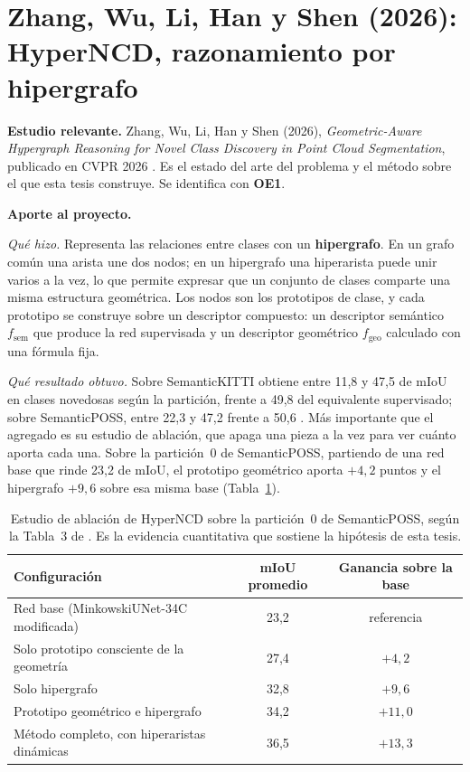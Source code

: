 \section[HyperNCD]{Zhang, Wu, Li, Han y Shen (2026): HyperNCD, razonamiento por
hipergrafo}
\label{sec:hyperncd}

\textbf{Estudio relevante.} Zhang, Wu, Li, Han y Shen (2026),
\emph{Geometric-Aware Hypergraph Reasoning for Novel Class Discovery in Point
Cloud Segmentation}, publicado en CVPR 2026 \cite{zhang2026hyperncd}. Es el
estado del arte del problema y el método sobre el que esta tesis construye. Se
identifica con \textbf{OE1}.

\textbf{Aporte al proyecto.}

\emph{Qué hizo.} Representa las relaciones entre clases con un
\textbf{hipergrafo}. En un grafo común una arista une dos nodos; en un hipergrafo
una hiperarista puede unir varios a la vez, lo que permite expresar que un
conjunto de clases comparte una misma estructura geométrica. Los nodos son los
prototipos de clase, y cada prototipo se construye sobre un descriptor compuesto:
un descriptor semántico $f_{\text{sem}}$ que produce la red supervisada y un
descriptor geométrico $f_{\text{geo}}$ calculado con una fórmula fija.

\emph{Qué resultado obtuvo.} Sobre SemanticKITTI obtiene entre 11,8 y 47,5 de
mIoU en clases novedosas según la partición, frente a 49,8 del equivalente
supervisado; sobre SemanticPOSS, entre 22,3 y 47,2 frente a
50,6 \cite[Tablas~1 y~2]{zhang2026hyperncd}.
Más importante que el agregado es su estudio de ablación, que apaga una pieza a
la vez para ver cuánto aporta cada una. Sobre la partición~0 de SemanticPOSS,
partiendo de una red base que rinde 23,2 de mIoU, el prototipo geométrico aporta
$+4{,}2$ puntos y el hipergrafo $+9{,}6$ sobre esa misma base
(Tabla~\ref{tab:ablacion-hyperncd}).

\begin{table}[!htbp]
\centering
{}\small
\caption[Ablación de HyperNCD en SemanticPOSS]{Estudio de ablación de HyperNCD sobre la partición~0 de SemanticPOSS,
según la Tabla~3 de \cite{zhang2026hyperncd}. Es la evidencia cuantitativa que
sostiene la hipótesis de esta tesis.}
\label{tab:ablacion-hyperncd}
\begin{tabularx}{\linewidth}{@{}>{\raggedright\arraybackslash\hsize=1.00\hsize}Xcc@{}}
\hline
Configuración & mIoU promedio & Ganancia sobre la base \\
\hline
Red base (MinkowskiUNet-34C modificada) & 23,2 & referencia \\
Solo prototipo consciente de la geometría & 27,4 & $+4{,}2$ \\
Solo hipergrafo & 32,8 & $+9{,}6$ \\
Prototipo geométrico e hipergrafo & 34,2 & $+11{,}0$ \\
Método completo, con hiperaristas dinámicas & 36,5 & $+13{,}3$ \\
\hline
\end{tabularx}
\end{table}

